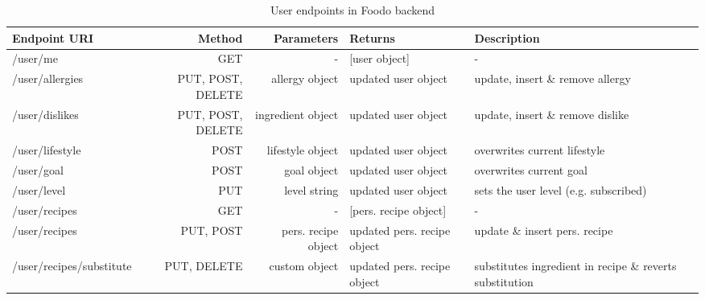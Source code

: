 \begin{table}[!ht]
	\hspace{-5pt}
	\begin{scriptsize}
		\begin{tabularx}{\textwidth + 5pt}{| @{\hspace{3pt}} B | @{\hspace{3pt}} N | @{\hspace{3pt}} N | @{\hspace{3pt}} O | @{\hspace{3pt}} H |}
		\hline
		\textbf{Endpoint URI} & \textbf{Method} & \textbf{Parameters} & \textbf{Returns} & \textbf{Description}\\
		\hline
		/user/me \lockicon & GET & -  &  [user object] & - \\
		\hline
		/user/allergies \lockicon & PUT, POST, DELETE & allergy object  & updated user object & update, insert \& remove allergy \\
		\hline
		/user/dislikes \lockicon & PUT, POST, DELETE & ingredient object  & updated user object & update, insert \& remove dislike \\
		\hline
		/user/lifestyle \lockicon & POST & lifestyle object  & updated user object & overwrites current lifestyle \\
		\hline
		/user/goal \lockicon & POST & goal object  & updated user object & overwrites current goal \\
		\hline
		/user/level \lockicon & PUT & level string  & updated user object & sets the user level (e.g. subscribed) \\
		\hline
		/user/recipes \lockicon & GET & -  &  [pers. recipe object] & - \\
		\hline
		/user/recipes \lockicon & PUT, POST & pers. recipe object  & updated pers. recipe object & update \& insert pers. recipe \\
		\hline
		/user/recipes/substitute \lockicon & PUT, DELETE & custom object  & updated pers. recipe object & substitutes ingredient in recipe \& reverts substitution  \\
		\hline
	\end{tabularx}
	\end{scriptsize}
	\caption{User endpoints in Foodo backend}
\vspace{1em}
\end{table}



